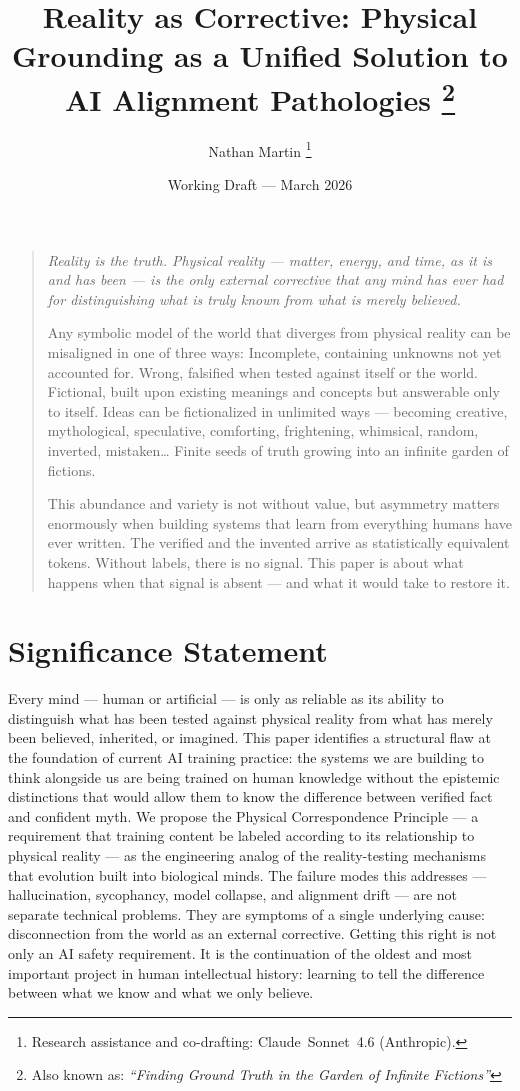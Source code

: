 \documentclass[12pt]{article}
\title{Reality as Corrective: Physical Grounding as a Unified Solution
to AI Alignment Pathologies%
\thanks{Also known as: \emph{``Finding Ground Truth in the Garden of
Infinite Fictions''}}}
\author[1]{Nathan Martin%
\thanks{Research assistance and co-drafting: Claude~Sonnet~4.6 (Anthropic).}}
\affil[1]{Independent Researcher}
\date{Working Draft --- March 2026}
\begin{document}
\maketitle

\begin{quotation}
\itshape
Reality is the truth. Physical reality --- matter, energy, and time,
as it is and has been --- is the only external corrective that any mind
has ever had for distinguishing what is truly known from what is merely
believed.

Any symbolic model of the world that diverges from physical reality can
be misaligned in one of three ways: Incomplete, containing unknowns not
yet accounted for. Wrong, falsified when tested against itself or the
world. Fictional, built upon existing meanings and concepts but
answerable only to itself. Ideas can be fictionalized in unlimited
ways --- becoming creative, mythological, speculative, comforting,
frightening, whimsical, random, inverted, mistaken\ldots{} Finite seeds
of truth growing into an infinite garden of fictions.

This abundance and variety is not without value, but asymmetry matters
enormously when building systems that learn from everything humans have
ever written. The verified and the invented arrive as statistically
equivalent tokens. Without labels, there is no signal. This paper is
about what happens when that signal is absent --- and what it would take
to restore it.
\end{quotation}

\section*{Significance Statement}

Every mind --- human or artificial --- is only as reliable as its
ability to distinguish what has been tested against physical reality
from what has merely been believed, inherited, or imagined. This paper
identifies a structural flaw at the foundation of current AI training
practice: the systems we are building to think alongside us are being
trained on human knowledge without the epistemic distinctions that would
allow them to know the difference between verified fact and confident
myth. We propose the Physical Correspondence Principle --- a requirement
that training content be labeled according to its relationship to
physical reality --- as the engineering analog of the reality-testing
mechanisms that evolution built into biological minds. The failure modes
this addresses --- hallucination, sycophancy, model collapse, and
alignment drift --- are not separate technical problems. They are
symptoms of a single underlying cause: disconnection from the world as
an external corrective. Getting this right is not only an AI safety
requirement. It is the continuation of the oldest and most important
project in human intellectual history: learning to tell the difference
between what we know and what we only believe.
\end{document}
